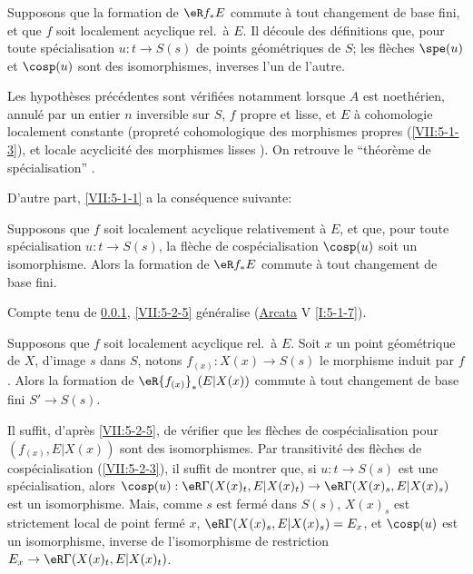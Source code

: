 \subsubsection{}\label{VII:5-2-4}

Supposons que la formation de $\eR f_\ast E$ commute à tout changement de 
base fini, et que $f$ soit localement acyclique rel.\ à $E$. Il découle des 
définitions que, pour toute spécialisation $u:t\to S(s)$ de points 
géométriques de $S$; les flèches $\spe(u)$ et $\cosp(u)$ sont des 
isomorphismes, inverses l'un de l'autre. 

Les hypothèses précédentes sont vérifiées notamment lorsque $A$ est 
noethérien, annulé par un entier $n$ inversible sur $S$, $f$ propre et 
lisse, et $E$ à cohomologie localement constante (propreté cohomologique 
des morphismes propres (\ref{VII:5-1-3}), et locale acyclicité des morphismes 
lisses ). On retrouve le ``théorème de spécialisation'' 
. 

D'autre part, \ref{VII:5-1-1} a la conséquence suivante: 





\begin{proposition}\label{VII:5-2-5}
Supposons que $f$ soit localement acyclique relativement à $E$, et que, pour 
toute spécialisation $u:t\to S(s)$, la flèche de cospécialisation 
$\cosp(u)$ soit un isomorphisme. Alors la formation de $\eR f_\ast E$ commute 
à tout changement de base fini. 
\end{proposition}

Compte tenu de \ref{VII:5-2-4}, \ref{VII:5-2-5} généralise 
(\hyperref[I]{Arcata} V \ref{I:5-1-7}). 





\begin{corollary}\label{VII:5-2-6}
Supposons que $f$ soit localement acyclique rel.\ à $E$. Soit $x$ un point 
géométrique de $X$, d'image $s$ dans $S$, notons $f_{(x)}:X(x)\to S(s)$ le 
morphisme induit par $f$. Alors la formation de $\eR {f_{(x)}}_\ast(E|X(x))$ 
commute à tout changement de base fini $S'\to S(s)$. 
\end{corollary}

Il suffit, d'après \ref{VII:5-2-5}, de vérifier que les flèches de 
cospécialisation pour $(f_{(x)},E|X(x))$ sont des isomorphismes. Par 
transitivité des flèches de cospécialisation (\ref{VII:5-2-3}), il suffit 
de montrer que, si $u:t\to S(s)$ est une spécialisation, alors 
$\cosp(u):\eR\Gamma(X(x)_t,E|X(x)_t)\to \eR\Gamma(X(x)_s,E|X(x)_s)$ est un 
isomorphisme. Mais, comme $s$ est fermé dans $S(s)$, $X(x)_s$ est strictement 
local de point fermé $x$, $\eR\Gamma(X(x)_s,E|X(x)_s)=E_x$, et 
$\cosp(u)$ est un isomorphisme, inverse de l'isomorphisme de restriction 
$E_x\to \eR\Gamma(X(x)_t,E|X(x)_t)$. 





